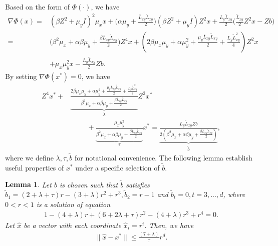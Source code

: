 \documentclass{osudissert96}
\DeclareMathOperator*{\argmin}{arg\,min}
\newtheorem{lemma}{Lemma}
\begin{document}
Based on the form of $\Phi(\cdot)$,  we have 
{\small\begin{align}\label{eq:aboveg}
\nabla \Phi(x) =& (\beta Z^2 +\mu_y I)^2\mu_x x + \Big(\alpha \mu_y +\frac{\bar L_{xy}\widetilde L_{xy}}{2}\Big) (\beta Z^2 +\mu_y I) Z^2 x + \frac{L_y\widetilde L_{xy}}{2}\Big(\frac{\widetilde L_{xy}}{2}Z^2x-Zb\Big) \nonumber
\\=& \Big( \beta^2\mu_x +\alpha \beta\mu_y+\frac{ \beta \bar L_{xy}\widetilde L_{xy}}{2}\Big) Z^4x + (2\beta\mu_x\mu_y+\alpha\mu_y^2+\frac{\mu_y\bar L_{xy}\widetilde L_{xy}}{2} +\frac{L_y\widetilde L_{xy}^2}{4}) Z^2x  \nonumber
\\&+ \mu_x\mu_y^2 x  - \frac{L_y\widetilde L_{xy}}{2} Zb.
\end{align}}
\hspace{-0.15cm}By setting $\nabla\Phi(x^*) = 0$, we have 
\begin{align}\label{z_equations}
Z^4x^* + &\underbrace{\frac{2\beta\mu_x\mu_y+\alpha\mu_y^2+\frac{\mu_y\bar L_{xy}\widetilde L_{xy}}{2} +\frac{L_y\widetilde L_{xy}^2}{4}}{\beta^2\mu_x +\alpha \beta\mu_y+\frac{ \beta \bar L_{xy}\widetilde L_{xy}}{2}}}_{\lambda} Z^2x^*  \nonumber
\\&\hspace{1cm}+ \underbrace{\frac{ \mu_x\mu_y^2}{\beta^2\mu_x +\alpha \beta\mu_y+\frac{ \beta \bar L_{xy}\widetilde L_{xy}}{2}}}_{\tau} x^* = \underbrace{\frac{L_y\widetilde L_{xy}Zb}{2(\beta^2\mu_x +\alpha \beta\mu_y+\frac{ \beta \bar L_{xy}\widetilde L_{xy}}{2})}}_{\widetilde b},
\end{align}
where we define $\lambda,\tau,\widetilde b$ for notational convenience. The following lemma establish useful properties of $x^*$ under a specific selection of $\widetilde b$. 
\begin{lemma}\label{le:x_star}
Let $b$ is chosen such that $\widetilde b$  satisfies $\widetilde  b_1= (2+\lambda +\tau) r -(3+\lambda)r^2 + r^3, \widetilde b_2 = r-1$ and $\widetilde b_t=0, t=3,...,d$, where $0<r<1$ is a solution of equation 
\begin{align}\label{eq:soulc}
1 - (4+\lambda)r + (6+2\lambda +\tau) r^2 -(4+\lambda) r^3 +r^4=0. 
\end{align}
Let $\hat x$ be a vector with each coordinate $\hat x_i = r^i$. Then, we have
\begin{align}
\|\hat x - x^*\| \leq \frac{(7+\lambda)
}{\tau}r^d.
\end{align}
\end{lemma}
\end{document}
